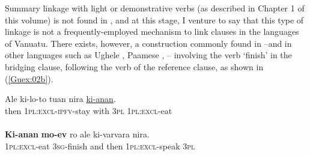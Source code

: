 \documentclass[output=paper]{LSP/langsci}
\begin{document}
Summary linkage with light or demonstrative verbs (as described in Chapter 1 of this volume) is not found in , and at this stage, I venture to say that this type of linkage is not a frequently-employed mechanism to link clauses in the  languages of Vanuatu. There exists, however, a construction commonly found in  --and in other  languages such as Ughele \citep{Frostad2012}, Paamese \citep[][39]{crowley03},  \citep{hyslop01}-- involving the verb `finish' in the bridging clause, following the verb of the reference clause, as shown in (\ref{Guex:02b}).

\begin{exe}
\ex \label{Guex:02ab}
\begin{xlist}
\ex \label{Guex:02a}
\gll Ale    ki-lo-to       tuan   nira \underline{ki-anan}.\\
then  \textsc{1pl:excl-ipfv}-stay   with   \textsc{3pl}  \textsc{1pl:excl}-eat\\
\glt {}\\
\ex \label{Guex:02b}
\gll \textbf{Ki-anan}           \textbf{mo-ev} ro      ale  ki-varvara           nira.\\     	       
    \textsc{1pl:excl}-eat    \textsc{3sg}-finish   and   then  \textsc{1pl:excl-}speak     \textsc{3pl}\\
\glt {} 
\end{xlist}
\end{exe}
\end{document}
